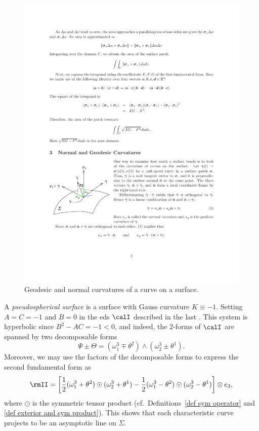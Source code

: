\begin{figure}[tp]
    \centering
    \includegraphics[scale=1]{figures/geodesic.pdf}
    \caption{Geodesic and normal curvatures of a curve on a surface.}
    \label{fig:geodesic curvature}
\end{figure}

A \emph{pseudospherical surface} is a surface with Gauss curvature $K\equiv -1$. Setting $A=C=-1$ and $B=0$ in the \gls{eds} $\calI$ described in the last \sect. This system is hyperbolic since $B^2-AC=-1<0$, and indeed, the $2$-forms of $\calI$ are spanned by two decomposable forms 
\[\Psi\pm \Theta=(\omega_1^3\mp \theta^2)\wedge(\omega_2^3\pm \theta^1).\]
Moreover, we may use the factors of the decomposable forms to express the second fundamental form as 
\[\rmII =\left[\frac12(\omega_1^3+\theta^2)\odot (\omega_2^3+\theta^1)-\frac12(\omega_1^3-\theta^2)\odot(\omega_2^3-\theta^1)\right]\otimes e_3,\]
where $\odot$ is the symmetric tensor product (cf.\ Definitions~\ref{def sym operator} and \ref{def exterior and sym product}). 
This shows that each characteristic curve projects to be an asymptotic line on $\Sigma$.

